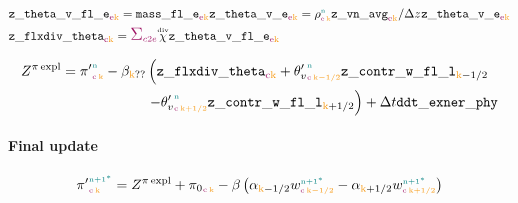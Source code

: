 \begin{align}
  & \zthetavfle_{\e\k} = \massfle_{\e\k} \zthetave_{\e\k} = \density{\n}{\e}{\k} \zvnavg_{\e\k} / \Dz{} \zthetave_{\e\k} \\
  & \zflxdivtheta_{\c\k} = \sum_{\offProv{c2e}} \Cdiv \zthetavfle_{\e\k}
\end{align}

\begin{equation}
  \begin{split}
    \Zexnerexpl = \exnerprime{\n}{\c}{\k} - \beta_{\k??}
      &\left( \zflxdivtheta_{\c\k} + \vpotempprime{\n}{\c}{\k-1/2} \zcontrwfll_{\k-1/2} \right.
      \\
      &\left.- \vpotempprime{\n}{\c}{\k+1/2} \zcontrwfll_{\k+1/2} \right) + \Dt \ddtexnerphy
  \end{split}
\end{equation}

\paragraph{Final update}

\begin{equation}
  \exnerprime{\n+1^*}{\c}{\k} = \Zexnerexpl + \exnerref{\c}{\k} - \beta \left( \alpha_{\k-1/2}\w{\n+1^*}{\c}{\k-1/2} -  \alpha_{\k+1/2}\w{\n+1^*}{\c}{\k+1/2} \right)
\end{equation}
